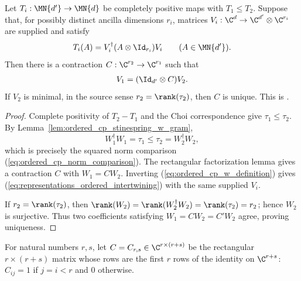 \begin{theorem}
    \label{thm:cp_dominates_stinespring_contraction}
    \leanok
    Let $T_i:\MN{d'}\to\MN{d}$ be completely positive maps with
    $T_1\leq T_2$. Suppose that, for possibly distinct ancilla dimensions
    $r_i$, matrices $V_i:\C^d\to\C^{d'}\otimes\C^{r_i}$ are supplied and
    satisfy
    \[
        T_i(A)=V_i^\dagger(A\otimes\Id_{r_i})V_i
        \qquad(A\in\MN{d'}).
    \]
    Then there is a contraction $C:\C^{r_2}\to\C^{r_1}$ such that
    \begin{align}
        V_1=(\Id_{d'}\otimes C)V_2.
        \label{eq:representations_ordered_intertwining}
    \end{align}
    If $V_2$ is minimal, in the source sense
    $r_2=\rank(\tau_2)$, then $C$ is unique. This is
    \cite[Theorem~2.3 and Equation~(2.13)]{Wolf2012Quantum}.
\end{theorem}

\begin{proof}\leanok
    Complete positivity of $T_2-T_1$ and the Choi correspondence give
    $\tau_1\leq\tau_2$. By
    Lemma~\ref{lem:ordered_cp_stinespring_w_gram},
    \[
        W_1^\dagger W_1=\tau_1\leq\tau_2=W_2^\dagger W_2,
    \]
    which is precisely the squared norm comparison
    (\ref{eq:ordered_cp_norm_comparison}). The rectangular factorization
    lemma gives a contraction $C$ with $W_1=CW_2$. Inverting
    (\ref{eq:ordered_cp_w_definition}) gives
    (\ref{eq:representations_ordered_intertwining}) with the same supplied
    $V_i$.

    If $r_2=\rank(\tau_2)$, then
    $\rank(W_2)=\rank(W_2^\dagger W_2)=\rank(\tau_2)=r_2$; hence $W_2$ is
    surjective. Thus two coefficients satisfying $W_1=CW_2=C'W_2$ agree,
    proving uniqueness.
\end{proof}

\begin{definition}\label{def:block_top_rows}
    \leanok
    For natural numbers $r,s$, let $C=C_{r,s}\in\C^{r\times(r+s)}$ be the
    rectangular $r\times(r+s)$ matrix whose rows are the first $r$ rows
    of the identity on $\C^{r+s}$: $C_{ij}=1$ if $j=i<r$ and $0$
    otherwise.
\end{definition}

